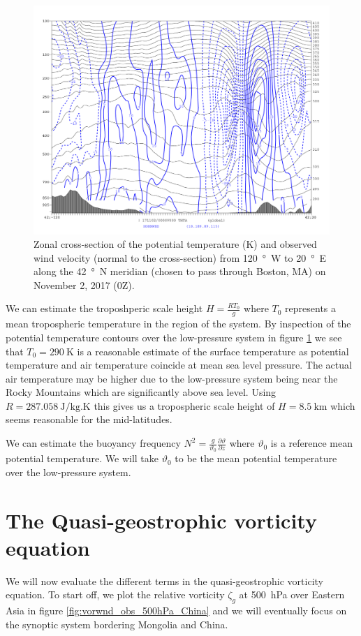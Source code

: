 \documentclass[11pt]{article}
\newcommand\p[2]{\frac{\partial #1}{\partial #2}}
\begin{document}
\begin{figure}[h!]
  \centering
  \includegraphics[width=\textwidth]{thta_normwnd_42N_120W-20E}
  \caption{Zonal cross-section of the potential temperature (K) and observed wind velocity (normal to the cross-section) from \SI{120}{\degree W} to \SI{20}{\degree E} along the \SI{42}{\degree N} meridian (chosen to pass through Boston, MA) on November 2, 2017 (0Z).}
  \label{fig:thta_normwnd_zon_xsec}
\end{figure}

We can estimate the troposhperic scale height $\displaystyle H = \frac{R T_0}{g}$ where $T_0$ represents a mean tropospheric temperature in the region of the system. By inspection of the potential temperature contours over the low-pressure system in figure \ref{fig:thta_normwnd_zon_xsec} we see that $T_0 = \SI{290}{\K}$ is a reasonable estimate of the surface temperature as potential temperature and air temperature coincide at mean sea level pressure. The actual air temperature may be higher due to the low-pressure system being near the Rocky Mountains which are significantly above sea level. Using $R = \SI{287.058}{\J/\kg.\K}$ this gives us a tropospheric scale height of $H = \SI{8.5}{\km}$ which seems reasonable for the mid-latitudes.

We can estimate the buoyancy frequency $\displaystyle N^2 = \frac{g}{\vartheta_0} \p{\vartheta}{z}$ where $\vartheta_0$ is a reference mean potential temperature. We will take $\vartheta_0$ to be the mean potential temperature over the low-pressure system.

\section{The Quasi-geostrophic vorticity equation}
We will now evaluate the different terms in the quasi-geostrophic vorticity equation. To start off, we plot the relative vorticity $\zeta_g$ at \SI{500}{\hecto\Pa} over Eastern Asia in figure \ref{fig:vorwnd_obs_500hPa_China} and we will eventually focus on the synoptic system bordering Mongolia and China.
\end{document}
